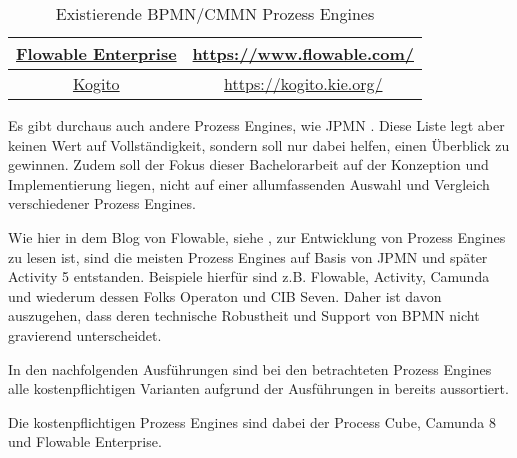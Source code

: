 \begin{center}
\begin{table}[]
\begin{tabular}{|c|c|}
        \href{https://www.flowable.com/}{Flowable Enterprise} &
        \href{https://www.flowable.com/}{https://www.flowable.com/} \\
        \hline

        \href{https://kogito.kie.org/}{Kogito} &
        \href{https://kogito.kie.org/}{https://kogito.kie.org/} \\
        \hline
    \end{tabular}
    \caption{Existierende BPMN/CMMN Prozess Engines}
    \label{tab:process_engine_list}
\end{table}
\end{center}
Es gibt durchaus auch andere Prozess Engines, wie JPMN \citep{apache_software_foundation_jbpm_2024}. Diese Liste legt aber keinen Wert auf Vollständigkeit, sondern soll nur dabei helfen, einen Überblick zu gewinnen. Zudem soll der Fokus dieser Bachelorarbeit auf der Konzeption und Implementierung liegen, nicht auf einer allumfassenden Auswahl und Vergleich verschiedener Prozess Engines.

Wie hier in dem Blog von Flowable, siehe \cite{holmes-higgin_digital_2019}, zur Entwicklung von Prozess Engines zu lesen ist, sind die meisten Prozess Engines auf Basis von JPMN und später Activity 5 entstanden. Beispiele hierfür sind z.B. Flowable, Activity, Camunda und wiederum dessen Folks Operaton und CIB Seven. Daher ist davon auszugehen, dass deren technische Robustheit und Support von \ac{BPMN} nicht gravierend unterscheidet.

In den nachfolgenden Ausführungen sind bei den betrachteten Prozess Engines alle kostenpflichtigen Varianten aufgrund der Ausführungen in  bereits aussortiert. 

Die kostenpflichtigen Prozess Engines sind dabei der Process Cube, Camunda 8 und Flowable Enterprise.

